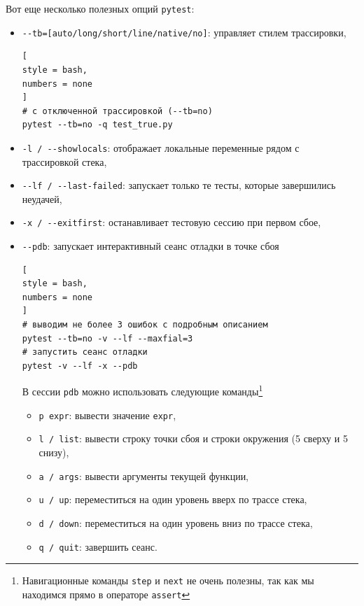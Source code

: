 \documentclass[%
	11pt,
	a4paper,
	utf8,
		]{article}
\begin{document}
Вот еще несколько полезных опций \texttt{pytest}:
\begin{itemize}
	\item \verb|--tb=[auto/long/short/line/native/no]|: управляет стилем трассировки,
\begin{lstlisting}[
style = bash,
numbers = none	
]
# с отключенной трассировкой (--tb=no)
pytest --tb=no -q test_true.py
\end{lstlisting}
	
	\item \verb|-l / --showlocals|: отображает локальные переменные рядом с трассировкой стека,
	
	\item \verb|--lf / --last-failed|: запускает только те тесты, которые завершились неудачей,
	
	\item \verb|-x / --exitfirst|: останавливает тестовую сессию при первом сбое,
	
	\item \verb|--pdb|: запускает интерактивный сеанс отладки в точке сбоя
\begin{lstlisting}[
style = bash,
numbers = none	
]
# выводим не более 3 ошибок с подробным описанием
pytest --tb=no -v --lf --maxfial=3
# запустить сеанс отладки
pytest -v --lf -x --pdb
\end{lstlisting}

    В сессии \texttt{pdb} можно использовать следующие команды\footnote{Навигационные команды \texttt{step} и \texttt{next} не очень полезны, так как мы находимся прямо в операторе \texttt{assert}}
    \begin{itemize}
    	\item \texttt{p expr}: вывести значение \texttt{expr},
    	
    	\item \texttt{l / list}: вывести строку точки сбоя и строки окружения (5 сверху и 5 снизу),
    	
    	\item \texttt{a / args}: вывести аргументы текущей функции,
    	
    	\item \texttt{u / up}: переместиться на один уровень вверх по трассе стека,
    	
    	\item \texttt{d / down}: переместиться на один уровень вниз по трассе стека,
    	
    	\item \texttt{q / quit}: завершить сеанс.
    \end{itemize}
\end{itemize}
\end{document}
